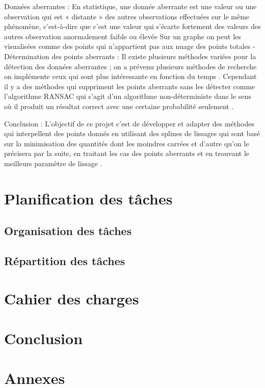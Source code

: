 \documentclass[a4paper,10pt]{article} %
\begin{document}
Données aberrantes :   
            En statistique, une donnée aberrante est une valeur ou une observation qui est « distante » des autres observations effectuées sur le même phénomène, c'est-à-dire que c’est une valeur qui s'écarte fortement des valeurs des autres observation anormalement faible ou élevée
                Sur un graphe on peut les visualisées comme des points qui n’appartient pas aux nuage des points totales
-          Détermination des points aberrants   :
Il existe plusieurs  méthodes variées pour la détection des données aberrantes ; on a prévenu plusieurs méthodes de recherche on implémente ceux qui sont plus intéressante en fonction du temps .
                Cependant  il y a des méthodes qui suppriment les points aberrants sans les détecter comme l’algorithme RANSAC qui s'agit d'un algorithme non-déterministe dans le sens où il produit un résultat correct avec une certaine probabilité seulement .
 
Conclusion :
            L’objectif de ce projet c’est de développer et adapter  des méthodes qui interpellent des points donnés en utilisant des splines de lissages qui sont basé sur la minimisation des 
quantités dont les  moindres carrées et d’autre qu’on le précisera par la suite, en traitant les cas des points aberrants et en trouvant  le meilleurs paramètre de lissage  .




\section{Planification des tâches}

	\subsection{Organisation des tâches}

	\subsection{Répartition des tâches}



\section{Cahier des charges}


\section*{Conclusion}

\section*{Annexes}
\end{document}

